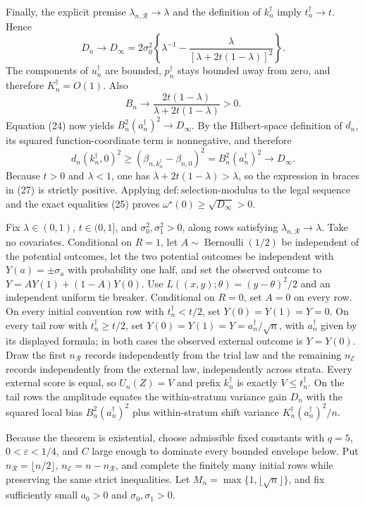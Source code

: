 Finally, the explicit premise \(\lambda_{n,\mathcal R}\to\lambda\) and the definition of \(k_n^{\dagger}\) imply \(t_n^{\dagger}\to t\).  Hence
\[
 D_n\longrightarrow
 D_\infty
 =2\sigma_0^2\left\{\lambda^{-1}
 -\frac{\lambda}{[\lambda+2t(1-\lambda)]^2}\right\}.
\tag{27}
\]
The components of \(u_n^{\dagger}\) are bounded, \(p_n^{\dagger}\) stays bounded away from zero, and therefore \(K_n^{\dagger}=O(1)\).  Also
\[
 B_n\longrightarrow
 \frac{2t(1-\lambda)}{\lambda+2t(1-\lambda)}>0.
\]
Equation (24) now yields \(B_n^2(a_n^{\dagger})^2\to D_\infty\).  By the Hilbert-space definition of \(d_n\), its squared function-coordinate term is nonnegative, and therefore
\[
 d_n(k_n^{\dagger},0)^2
 \geq(\beta_{n,k_n^{\dagger}}-\beta_{n,0})^2
 =B_n^2(a_n^{\dagger})^2
 \longrightarrow D_\infty.
\tag{28}
\]
Because \(t>0\) and \(\lambda<1\), one has \(\lambda+2t(1-\lambda)>\lambda\), so the expression in braces in (27) is strictly positive.  Applying \(\mathrm{def:selection\text{-}modulus}\) to the legal sequence and the exact equalities (25) proves \(\omega^{\star}(0)\geq\sqrt{D_\infty}>0\).

Fix \(\lambda\in(0,1)\), \(t\in(0,1]\), and \(\sigma_0^2,\sigma_1^2>0\), along rows satisfying \(\lambda_{n,\mathcal R}\to\lambda\).  Take no covariates.  Conditional on \(R=1\), let \(A\sim\operatorname{Bernoulli}(1/2)\) be independent of the potential outcomes, let the two potential outcomes be independent with \(Y(a)=\pm\sigma_a\) with probability one half, and set the observed outcome to \(Y=AY(1)+(1-A)Y(0)\).  Use \(L((x,y);\theta)=(y-\theta)^2/2\) and an independent uniform tie breaker.  Conditional on \(R=0\), set \(A=0\) on every row.  On every initial convention row with \(t_n^{\dagger}<t/2\), set \(Y(0)=Y(1)=Y=0\).  On every tail row with \(t_n^{\dagger}\geq t/2\), set \(Y(0)=Y(1)=Y=a_n^{\dagger}/\sqrt n\), with \(a_n^{\dagger}\) given by its displayed formula; in both cases the observed external outcome is \(Y=Y(0)\).  Draw the first \(n_{\mathcal R}\) records independently from the trial law and the remaining \(n_{\mathcal E}\) records independently from the external law, independently across strata.  Every external score is equal, so \(U_n(Z)=V\) and prefix \(k_n^{\dagger}\) is exactly \(V\leq t_n^{\dagger}\).  On the tail rows the amplitude equates the within-stratum variance gain \(D_n\) with the squared local bias \(B_n^2(a_n^{\dagger})^2\) plus within-stratum shift variance \(K_n^{\dagger}(a_n^{\dagger})^2/n\).

Because the theorem is existential, choose admissible fixed constants with \(q=5\), \(0<\varepsilon<1/4\), and \(C\) large enough to dominate every bounded envelope below.  Put \(n_{\mathcal R}=\lfloor n/2\rfloor\), \(n_{\mathcal E}=n-n_{\mathcal R}\), and complete the finitely many initial rows while preserving the same strict inequalities.  Let \(M_n=\max\{1,\lfloor\sqrt n\rfloor\}\), and fix sufficiently small \(a_0>0\) and \(\sigma_0,\sigma_1>0\).

